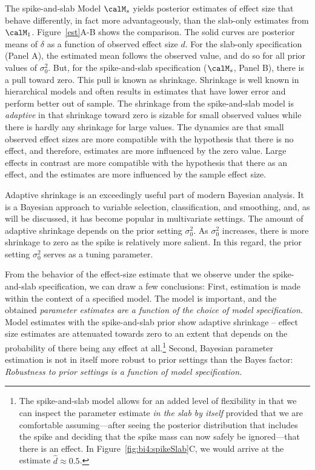 The spike-and-slab Model $\calM_s$ yields posterior estimates of effect size that behave differently, in fact more advantageously, than the slab-only estimates from $\calM_1$.  Figure~\ref{est}A-B shows the comparison.  The solid curves are posterior means of $\delta$ as a function of observed effect size $d$.  For the slab-only specification (Panel A), the estimated mean follows the observed value, and do so for all prior values of $\sigma^2_0$.   But, for the spike-and-slab specification ($\calM_s$, Panel B), there is a pull toward zero.  This pull is known as shrinkage.   Shrinkage is well known in hierarchical models and often results in estimates that have lower error and perform better out of sample\cite{James:Stein:1961,Efron:Morris:1977}.  The shrinkage from the spike-and-slab model is {\em adaptive} in that shrinkage toward zero is sizable for small observed values while there is hardly any shrinkage for large values.  The dynamics are that small observed effect sizes are more compatible with the hypothesis that there is no effect, and therefore, estimates are more influenced by the zero value.  Large effects in contrast are more compatible with the hypothesis that there as an effect, and the estimates are more influenced by the sample effect size.

Adaptive shrinkage is an exceedingly useful part of modern Bayesian analysis.  It is a Bayesian approach to variable selection, classification, and smoothing, and, as will be discussed, it has become popular in multivariate settings.  
The amount of adaptive shrinkage depends on the prior setting $\sigma^2_0$.  As $\sigma_0^2$ increases, there is more shrinkage to zero as the spike is relatively more salient.  In this regard, the prior setting $\sigma_0^2$ serves as a tuning parameter.

From the behavior of the effect-size estimate that we observe under the spike-and-slab specification, we can draw a few conclusions: First, estimation is made within the context of a specified model.  The model is important, and  the obtained \emph{parameter estimates are a function of the choice of model specification}.  Model estimates with the spike-and-slab prior show adaptive shrinkage -- effect size estimates are attenuated towards zero to an extent that depends on the probability of there being any effect at all.\footnote{The spike-and-slab model allows for an added level of flexibility in that we can inspect the parameter estimate \emph{in the slab by itself} provided that we are comfortable assuming---after seeing the posterior distribution that includes the spike and deciding that the spike mass can now safely be ignored---that there is an effect.  In Figure~\ref{fig:bi4:spikeSlab}C, we would arrive at the estimate $\hat{d} \approx 0.5$.}
Second, Bayesian parameter estimation is not in itself more robust to prior settings than the Bayes factor: \emph{Robustness to prior settings is a function of model specification.}


